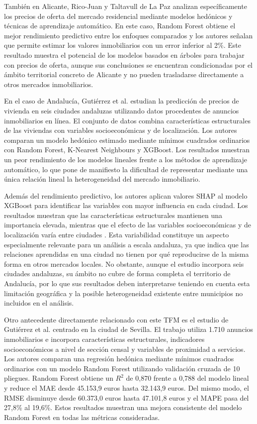 \documentclass[IB]{TFUOC}%
\begin{document}
También en Alicante, Rico-Juan y Taltavull de La Paz \cite{ricojuan2021asking} analizan específicamente los precios de oferta del mercado residencial mediante modelos hedónicos y técnicas de aprendizaje automático. En este caso, Random Forest obtiene el mejor rendimiento predictivo entre los enfoques comparados y los autores señalan que permite estimar los valores inmobiliarios con un error inferior al 2\%. Este resultado muestra el potencial de los modelos basados en árboles para trabajar con precios de oferta, aunque sus conclusiones se encuentran condicionadas por el ámbito territorial concreto de Alicante y no pueden trasladarse directamente a otros mercados inmobiliarios.

En el caso de Andalucía, Gutiérrez et al. \cite{gutierrez2026andalusia} estudian la predicción de precios de vivienda en seis ciudades andaluzas utilizando datos procedentes de anuncios inmobiliarios en línea. El conjunto de datos combina características estructurales de las viviendas con variables socioeconómicas y de localización. Los autores comparan un modelo hedónico estimado mediante mínimos cuadrados ordinarios con Random Forest, K-Nearest Neighbours y XGBoost. Los resultados muestran un peor rendimiento de los modelos lineales frente a los métodos de aprendizaje automático, lo que pone de manifiesto la dificultad de representar mediante una única relación lineal la heterogeneidad del mercado inmobiliario.

Además del rendimiento predictivo, los autores aplican valores SHAP al modelo XGBoost para identificar las variables con mayor influencia en cada ciudad. Los resultados muestran que las características estructurales mantienen una importancia elevada, mientras que el efecto de las variables socioeconómicas y de localización varía entre ciudades \cite{gutierrez2026andalusia}. Esta variabilidad constituye un aspecto especialmente relevante para un análisis a escala andaluza, ya que indica que las relaciones aprendidas en una ciudad no tienen por qué reproducirse de la misma forma en otros mercados locales. No obstante, aunque el estudio incorpora seis ciudades andaluzas, su ámbito no cubre de forma completa el territorio de Andalucía, por lo que sus resultados deben interpretarse teniendo en cuenta esta limitación geográfica y la posible heterogeneidad existente entre municipios no incluidos en el análisis.

Otro antecedente directamente relacionado con este TFM es el estudio de Gutiérrez et al. \cite{gutierrez2026sevilla} centrado en la ciudad de Sevilla. El trabajo utiliza 1.710 anuncios inmobiliarios e incorpora características estructurales, indicadores socioeconómicos a nivel de sección censal y variables de proximidad a servicios. Los autores comparan una regresión hedónica mediante mínimos cuadrados ordinarios con un modelo Random Forest utilizando validación cruzada de 10 pliegues. Random Forest obtiene un $R^2$ de 0,870 frente a 0,788 del modelo lineal y reduce el MAE desde 45.153,9 euros hasta 32.143,9 euros. Del mismo modo, el RMSE disminuye desde 60.373,0 euros hasta 47.101,8 euros y el MAPE pasa del 27,8\% al 19,6\%. Estos resultados muestran una mejora consistente del modelo Random Forest en todas las métricas consideradas.
\end{document}
